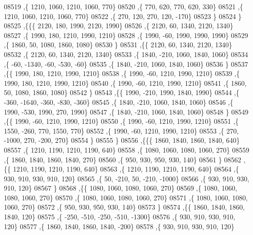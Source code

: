 \begin{DoxyCode}
08519     ,\{  1210,  1060,  1210,  1060,   770\}
08520     ,\{   770,   620,   770,   620,   330\}
08521     ,\{  1210,  1060,  1210,  1060,   770\}
08522     ,\{   270,   120,   270,   120,  -170\}
08523     \}
08524    \}
08525   ,\{\{\{  2120,   180,  1990,  2120,  1990\}
08526     ,\{  2120,    60,  1340,  2120,  1340\}
08527     ,\{  1990,   180,  1210,  1990,  1210\}
08528     ,\{  1990,   -60,  1990,  1990,  1990\}
08529     ,\{  1860,    50,  1080,  1860,  1080\}
08530     \}
08531    ,\{\{  2120,    60,  1340,  2120,  1340\}
08532     ,\{  2120,    60,  1340,  2120,  1340\}
08533     ,\{  1840,  -210,  1060,  1840,  1060\}
08534     ,\{   -60, -1340,   -60,  -530,   -60\}
08535     ,\{  1840,  -210,  1060,  1840,  1060\}
08536     \}
08537    ,\{\{  1990,   180,  1210,  1990,  1210\}
08538     ,\{  1990,   -60,  1210,  1990,  1210\}
08539     ,\{  1990,   180,  1210,  1990,  1210\}
08540     ,\{  1990,   -60,  1210,  1990,  1210\}
08541     ,\{  1860,    50,  1080,  1860,  1080\}
08542     \}
08543    ,\{\{  1990,  -210,  1990,  1840,  1990\}
08544     ,\{  -360, -1640,  -360,  -830,  -360\}
08545     ,\{  1840,  -210,  1060,  1840,  1060\}
08546     ,\{  1990,  -530,  1990,   270,  1990\}
08547     ,\{  1840,  -210,  1060,  1840,  1060\}
08548     \}
08549    ,\{\{  1990,   -60,  1210,  1990,  1210\}
08550     ,\{  1990,   -60,  1210,  1990,  1210\}
08551     ,\{  1550,  -260,   770,  1550,   770\}
08552     ,\{  1990,   -60,  1210,  1990,  1210\}
08553     ,\{   270, -1000,   270,  -200,   270\}
08554     \}
08555    \}
08556   ,\{\{\{  1860,  1840,  1860,  1840,   640\}
08557     ,\{  1210,  1190,  1210,  1190,   640\}
08558     ,\{  1080,  1060,  1080,  1060,   270\}
08559     ,\{  1860,  1840,  1860,  1840,   270\}
08560     ,\{   950,   930,   950,   930,   140\}
08561     \}
08562    ,\{\{  1210,  1190,  1210,  1190,   640\}
08563     ,\{  1210,  1190,  1210,  1190,   640\}
08564     ,\{   930,   910,   930,   910,   120\}
08565     ,\{    50,  -210,    50,  -210, -1000\}
08566     ,\{   930,   910,   930,   910,   120\}
08567     \}
08568    ,\{\{  1080,  1060,  1080,  1060,   270\}
08569     ,\{  1080,  1060,  1080,  1060,   270\}
08570     ,\{  1080,  1060,  1080,  1060,   270\}
08571     ,\{  1080,  1060,  1080,  1060,   270\}
08572     ,\{   950,   930,   950,   930,   140\}
08573     \}
08574    ,\{\{  1860,  1840,  1860,  1840,   120\}
08575     ,\{  -250,  -510,  -250,  -510, -1300\}
08576     ,\{   930,   910,   930,   910,   120\}
08577     ,\{  1860,  1840,  1860,  1840,  -200\}
08578     ,\{   930,   910,   930,   910,   120\}

\end{DoxyCode}
